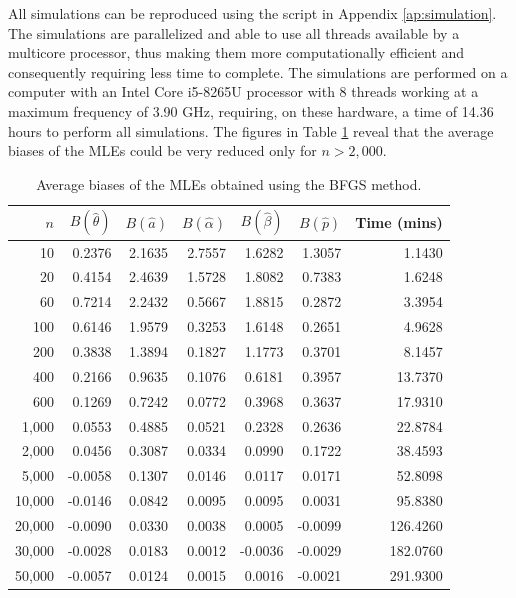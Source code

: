 \documentclass[12pt,a4paper]{article} %
\begin{document}
All simulations can be reproduced using the script in Appendix \ref{ap:simulation}. The simulations are parallelized and able to use all threads
available by a multicore processor, thus making them more computationally efficient and consequently requiring less time to complete.
The simulations are performed on a computer with an Intel Core i5-8265U processor with 8 threads working at a maximum frequency of 3.90 GHz,
requiring, on these hardware, a time of 14.36 hours to perform all simulations. The figures in Table \ref{tab:bias} reveal that the average
biases of the MLEs could be very reduced only for $n> 2,000$.

\begin{table}[H]
	\centering
	\caption{Average biases of the MLEs obtained using the BFGS method.}\label{tab:bias}
	\begin{tabular}{rrrrrrr}
		\hline
		$n$ & $B(\hat{\theta})$ & $B(\hat{a})$ & $B(\hat{\alpha})$ & $B(\hat{\beta})$ & $B(\hat{p})$ & Time (mins)\\
		\hline
		10 & 0.2376 & 2.1635 & 2.7557 & 1.6282 & 1.3057 & 1.1430\\
		20 & 0.4154 & 2.4639 & 1.5728 & 1.8082 & 0.7383 & 1.6248\\
		60 & 0.7214 & 2.2432 & 0.5667 & 1.8815 & 0.2872 & 3.3954\\
		100 & 0.6146 & 1.9579 & 0.3253 & 1.6148 & 0.2651 & 4.9628\\
		200 & 0.3838 & 1.3894 & 0.1827 & 1.1773 & 0.3701 & 8.1457\\
		400 & 0.2166 & 0.9635 & 0.1076 & 0.6181 & 0.3957 & 13.7370\\
		600 & 0.1269 & 0.7242 & 0.0772 & 0.3968 & 0.3637 & 17.9310\\
		1,000 & 0.0553 & 0.4885 & 0.0521 & 0.2328 & 0.2636 & 22.8784 \\
		2,000  &  0.0456 & 0.3087 &  0.0334 &  0.0990 & 0.1722 &  38.4593\\
		5,000 & -0.0058 & 0.1307 & 0.0146 & 0.0117 & 0.0171 & 52.8098\\
		10,000 & -0.0146 & 0.0842 & 0.0095 & 0.0095 & 0.0031 & 95.8380\\
		20,000 & -0.0090 & 0.0330 & 0.0038 & 0.0005 & -0.0099 & 126.4260\\
		30,000 & -0.0028 & 0.0183 & 0.0012 & -0.0036 & -0.0029 & 182.0760\\
		50,000 & -0.0057 & 0.0124 & 0.0015 & 0.0016 & -0.0021 & 291.9300\\
		\hline
	\end{tabular}
\end{table}
\end{document}
